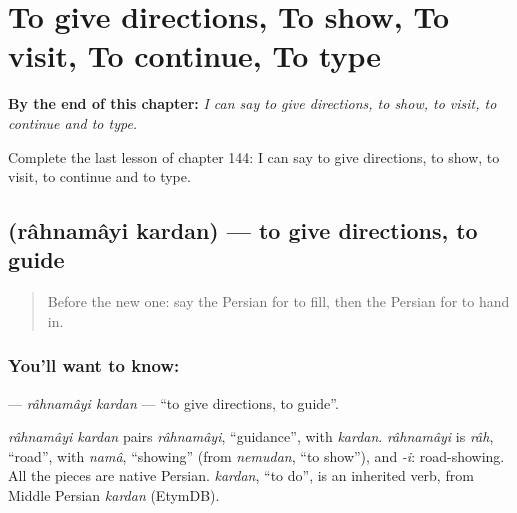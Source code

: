 
\chapter{To give directions, To show, To visit, To continue, To type}
\label{ch:fa-to-give-directions-to-show-to-visit-to-continue-to-type}

\begin{chapteropening}
\textbf{By the end of this chapter:} \emph{I can say to give directions, to show, to visit, to continue and to type.}

Complete the last lesson of chapter 144: I can say to give directions, to show, to visit, to continue and to type.
\end{chapteropening}

\section[\texorpdfstring{\fa{راهنمایی} \fa{کردن} (râhnamâyi kardan)}{راهنمایی کردن (râhnamâyi kardan)}]{  (râhnamâyi kardan) — to give directions, to guide}

\label{lesson:FA-C144-rahnamayi-kardan}



\begin{quote}
Before the new one: say the Persian for to fill, then the Persian for to hand in.
\end{quote}

\subsection*{You'll want to know:  }
\textbf{ } — \emph{râhnamâyi kardan} — \textquotedblleft{}to give directions, to guide\textquotedblright{}.

\begin{cousinweb}
\emph{râhnamâyi kardan} pairs \emph{râhnamâyi}, \textquotedblleft{}guidance\textquotedblright{}, with \emph{kardan}. \emph{râhnamâyi} is \emph{râh}, \textquotedblleft{}road\textquotedblright{}, with \emph{namâ}, \textquotedblleft{}showing\textquotedblright{} (from \emph{nemudan}, \textquotedblleft{}to show\textquotedblright{}), and \emph{-i}: road-showing. All the pieces are native Persian. \emph{kardan}, \textquotedblleft{}to do\textquotedblright{}, is an inherited verb, from Middle Persian \emph{kardan} (EtymDB).
\end{cousinweb}

